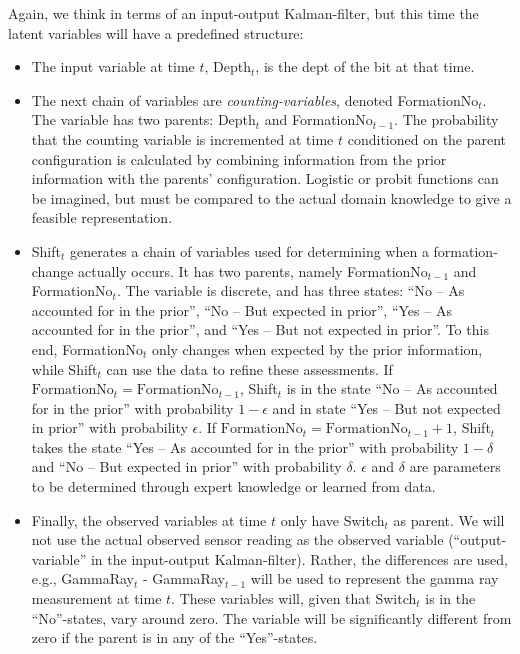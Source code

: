 Again, we think in terms of an input-output Kalman-filter, but this time the latent variables will have a predefined structure:
\begin{itemize}

\item The input variable at time $t$, Depth$_t$, is the dept of the bit at that time.

\item The next chain of variables are \textit{counting-variables}, denoted FormationNo$_t$. The variable has two parents: Depth$_t$ and FormationNo$_{t-1}$. 
The probability that the counting variable is incremented at time $t$ conditioned on the parent configuration is calculated by combining information from the prior information with the parents' configuration. Logistic or probit functions can  be imagined, but must be compared to the actual domain knowledge to give a feasible representation.

\item Shift$_t$  generates a  chain of variables used for determining when   a formation-change actually occurs. It has two parents, namely  FormationNo$_{t-1}$ and  FormationNo$_t$. 
The variable is discrete, and has three states: ``No -- As accounted for in the prior'', ``No -- But expected in prior'', ``Yes -- As accounted for in the prior'', and ``Yes -- But not expected in prior''. 
To this end, FormationNo$_t$ only changes when expected by the prior information, while Shift$_t$ can use the data to refine these assessments. If $\mbox{FormationNo}_{t}= \mbox{FormationNo}_{t-1}$, Shift$_t$ is in the state 
 ``No -- As accounted for in the prior'' with probability $1-\epsilon$ and in state ``Yes -- But not expected in prior'' with probability $\epsilon$. If $\mbox{FormationNo}_{ t}=\mbox{FormationNo}_{t-1}+1$, Shift$_t$ takes the state 
``Yes -- As accounted for in the prior'' with probability $1-\delta$ and ``No -- But expected in prior'' with probability $\delta$. $\epsilon$ and $\delta$ are parameters to be determined through expert knowledge or learned from data.

\item Finally, the observed variables at time $t$ only have  Switch$_t$ as parent. We will not use the actual observed sensor reading as the observed variable (``output-variable'' in the input-output Kalman-filter). Rather, the differences are used, e.g., GammaRay$_t$ - GammaRay$_{t-1}$ will be used to represent the gamma ray measurement at time $t$. These variables will, given that Switch$_t$ is in the ``No''-states, vary around zero. The variable will be significantly different from zero if the parent is in any of the ``Yes''-states.
\end{itemize}

